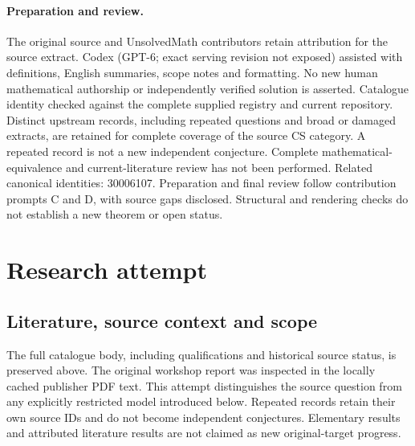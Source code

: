 \documentclass[11pt]{article}
\begin{document}
\paragraph{Preparation and review.}
The original source and UnsolvedMath contributors retain attribution for the source extract. Codex (GPT-6; exact serving revision not exposed) assisted with definitions, English summaries, scope notes and formatting. No new human mathematical authorship or independently verified solution is asserted. Catalogue identity checked against the complete supplied registry and current repository. Distinct upstream records, including repeated questions and broad or damaged extracts, are retained for complete coverage of the source CS category. A repeated record is not a new independent conjecture. Complete mathematical-equivalence and current-literature review has not been performed. Related canonical identities: 30006107. Preparation and final review follow contribution prompts C and D, with source gaps disclosed. Structural and rendering checks do not establish a new theorem or open status.
\label{end:statement}

\section{Research attempt}
\subsection{Literature, source context and scope}
The full catalogue body, including qualifications and historical source status, is preserved above. The original workshop report was inspected in the locally cached publisher PDF text. This attempt distinguishes the source question from any explicitly restricted model introduced below. Repeated records retain their own source IDs and do not become independent conjectures. Elementary results and attributed literature results are not claimed as new original-target progress.
\end{document}

